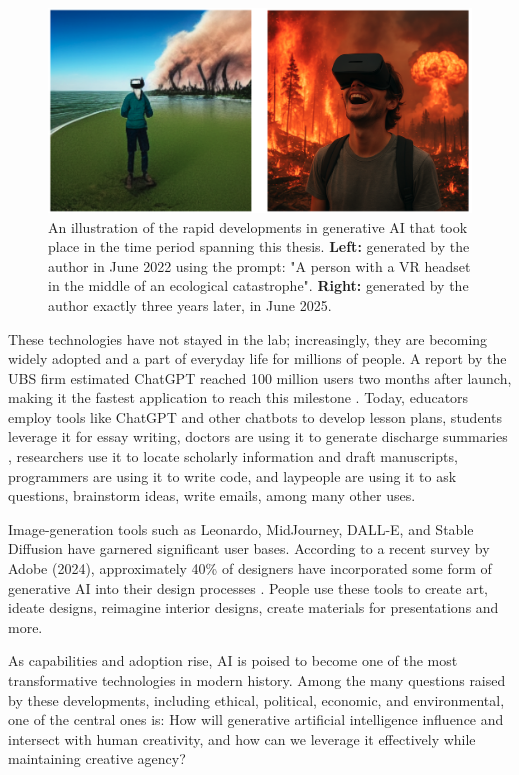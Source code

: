 \begin{figure}
    \centering
    \includegraphics[width=1\linewidth]{comparisonimages.png}
    \caption{An illustration of the rapid developments in generative AI that took place in the time period spanning this thesis. \textbf{Left:} generated by the author in June 2022 using the prompt: "A person with a VR headset in the middle of an ecological catastrophe". \textbf{Right:} generated by the author exactly three years later, in June 2025.}
    \label{fig:enter-label}
\end{figure}

These technologies have not stayed in the lab; increasingly, they are becoming widely adopted and a part of everyday life for millions of people. A report by the UBS firm estimated ChatGPT reached 100 million users two months after launch, making it the fastest application to reach this milestone \cite{Hu2023-ie}. Today, educators employ tools like ChatGPT and other chatbots to develop lesson plans, students leverage it for essay writing, doctors are using it to generate discharge summaries \cite{Patel2023-fg}, researchers use it to locate scholarly information and draft manuscripts, programmers are using it to write code, and laypeople are using it to ask questions, brainstorm ideas, write emails, among many other uses. 

Image-generation tools such as Leonardo, MidJourney, DALL-E, and Stable Diffusion have garnered significant user bases. According to a recent survey by Adobe (2024), approximately 40\% of designers have incorporated some form of generative AI into their design processes \cite{Offerman2024-lf}. People use these tools to create art, ideate designs, reimagine interior designs, create materials for presentations and more. 

As capabilities and adoption rise, AI is poised to become one of the most transformative technologies in modern history. Among the many questions raised by these developments, including ethical, political, economic, and environmental, one of the central ones is: How will generative artificial intelligence influence and intersect with human creativity, and how can we leverage it effectively while maintaining creative agency?

